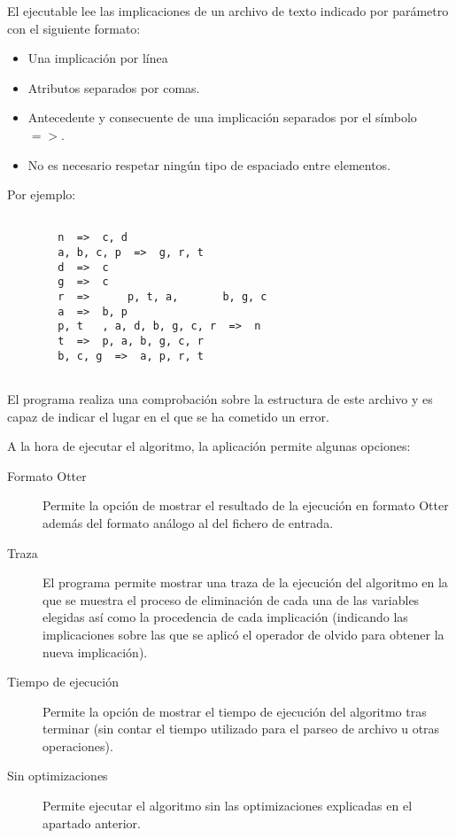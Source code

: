 	El ejecutable lee las implicaciones de un archivo de texto indicado por parámetro con el siguiente formato:
	
	\begin{itemize}
		\item Una implicación por línea
		\item Atributos separados por comas.
		\item Antecedente y consecuente de una implicación separados por el símbolo $=>$.
		\item No es necesario respetar ningún tipo de espaciado entre elementos.
	\end{itemize}

	Por ejemplo:
	
	\begin{lstlisting}
		
		n  =>  c, d 
		a, b, c, p  =>  g, r, t 
		d  =>  c 
		g  =>  c 
		r  =>      p, t, a,       b, g, c 
		a  =>  b, p 
		p, t   , a, d, b, g, c, r  =>  n 
		t  =>  p, a, b, g, c, r 
		b, c, g  =>  a, p, r, t 
	
	\end{lstlisting}
	
	El programa realiza una comprobación sobre la estructura de este archivo y es capaz de indicar el lugar en el que se ha cometido un error.
	
	A la hora de ejecutar el algoritmo, la aplicación permite algunas opciones:
	
	\begin{description}
		\item[Formato Otter] 
			Permite la opción de mostrar el resultado de la ejecución en formato Otter además del formato análogo al del fichero de entrada.
		\item[Traza] 
			El programa permite mostrar una traza de la ejecución del algoritmo en la que se muestra el proceso de eliminación de cada una de las variables elegidas así como la procedencia de cada implicación (indicando las implicaciones sobre las que se aplicó el operador de olvido para obtener la nueva implicación).
		\item[Tiempo de ejecución] 
			Permite la opción de mostrar el tiempo de ejecución del algoritmo tras terminar (sin contar el tiempo utilizado para el parseo de archivo u otras operaciones).
		\item[Sin optimizaciones] 
			Permite ejecutar el algoritmo sin las optimizaciones explicadas en el apartado anterior.
	\end{description}
	
